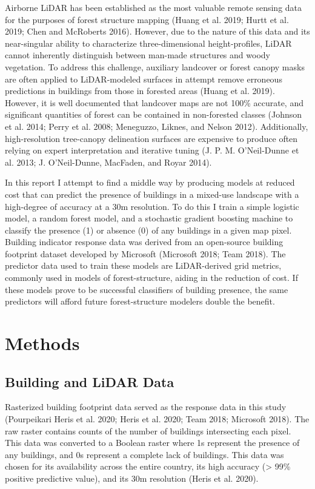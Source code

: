 \documentclass[]{elsarticle} %
\begin{document}
Airborne LiDAR has been established as the most valuable remote sensing data for
the purposes of forest structure mapping (Huang et al. 2019; Hurtt et al. 2019; Chen and McRoberts 2016).
However, due to the nature of this data and its near-singular ability to
characterize three-dimensional height-profiles,
LiDAR cannot inherently distinguish between man-made structures and woody
vegetation.
To address this challenge, auxiliary landcover or forest canopy masks
are often applied to LiDAR-modeled surfaces in attempt remove erroneous
predictions in buildings from those in forested areas (Huang et al. 2019).
However, it is well documented that landcover maps are not 100\% accurate, and
significant quantities of forest can be contained in non-forested classes
(Johnson et al. 2014; Perry et al. 2008; Meneguzzo, Liknes, and Nelson 2012).
Additionally, high-resolution tree-canopy delineation surfaces are expensive
to produce often relying on expert interpretation and iterative tuning (J. P. M. O'Neil-Dunne et al. 2013; J. O'Neil-Dunne, MacFaden, and Royar 2014).

In this report I attempt to find a middle way by producing models at reduced
cost that can predict the presence of buildings in a mixed-use landscape with a high-degree of accuracy at a 30m resolution.
To do this I train a simple logistic model,
a random forest model, and a stochastic gradient boosting machine to classify
the presence (1) or absence (0) of any buildings in a given map pixel.
Building indicator response data was derived from an open-source building
footprint dataset developed by Microsoft (Microsoft 2018; Team 2018).
The predictor data used to train these models are LiDAR-derived grid metrics, commonly used in models of forest-structure, aiding in the reduction of cost.
If these models prove to be successful classifiers of building presence,
the same predictors will afford future forest-structure modelers double the
benefit.

\hypertarget{methods}{%
\section{Methods}\label{methods}}

\hypertarget{building-and-lidar-data}{%
\subsection{Building and LiDAR Data}\label{building-and-lidar-data}}

Rasterized building footprint data served as the response data in this study
(Pourpeikari Heris et al. 2020; Heris et al. 2020; Team 2018; Microsoft 2018).
The raw raster contains counts of the number of buildings intersecting each
pixel.
This data was converted to a Boolean raster where 1s represent the presence of
any buildings, and 0s represent a complete lack of buildings.
This data was chosen for its availability across the entire country, its high
accuracy (\textgreater{} 99\% positive predictive value), and its 30m resolution
(Heris et al. 2020).
\end{document}
